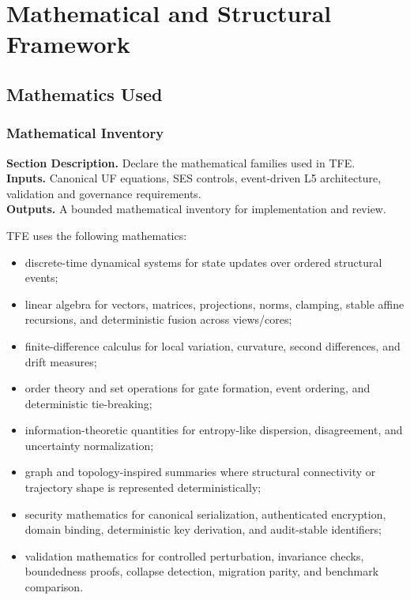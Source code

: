 \documentclass[11pt]{report}
\newcommand{\meta}[3]{\textbf{Section Description.} #1\\
\textbf{Inputs.} #2\\
\textbf{Outputs.} #3\par}
\begin{document}
\part{Mathematical and Structural Framework}


\chapter{Mathematics Used}
\section{Mathematical Inventory}
\meta{Declare the mathematical families used in TFE.}{Canonical UF equations, SES controls, event-driven L5 architecture, validation and governance requirements.}{A bounded mathematical inventory for implementation and review.}

TFE uses the following mathematics:
\begin{itemize}
    \item discrete-time dynamical systems for state updates over ordered structural events;
    \item linear algebra for vectors, matrices, projections, norms, clamping, stable affine recursions, and deterministic fusion across views/cores;
    \item finite-difference calculus for local variation, curvature, second differences, and drift measures;
    \item order theory and set operations for gate formation, event ordering, and deterministic tie-breaking;
    \item information-theoretic quantities for entropy-like dispersion, disagreement, and uncertainty normalization;
    \item graph and topology-inspired summaries where structural connectivity or trajectory shape is represented deterministically;
    \item security mathematics for canonical serialization, authenticated encryption, domain binding, deterministic key derivation, and audit-stable identifiers;
    \item validation mathematics for controlled perturbation, invariance checks, boundedness proofs, collapse detection, migration parity, and benchmark comparison.
\end{itemize}
\end{document}
